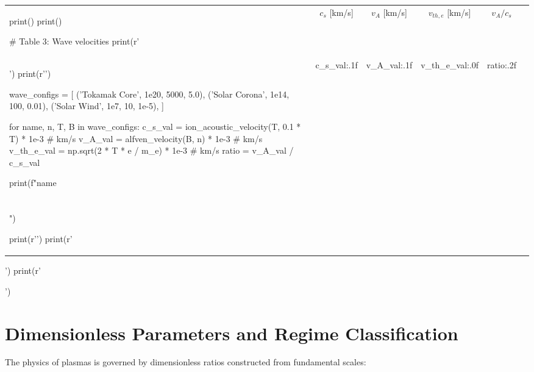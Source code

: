\documentclass[11pt,a4paper]{article}
\begin{document}
\begin{pycode}
\begin{table}[H]
\begin{tabular}{@{}lccccc@{}}
print()
print()

# Table 3: Wave velocities
print(r'\begin{table}[H]')
print(r'\centering')
print(r'\caption{Wave Propagation Velocities}')
print(r'\begin{tabular}{@{}lcccc@{}}')
print(r'\toprule')
print(r'Regime & $c_s$ [km/s] & $v_A$ [km/s] & $v_{th,e}$ [km/s] & $v_A/c_s$ \\')
print(r'\midrule')

wave_configs = [
    ('Tokamak Core', 1e20, 5000, 5.0),
    ('Solar Corona', 1e14, 100, 0.01),
    ('Solar Wind', 1e7, 10, 1e-5),
]

for name, n, T, B in wave_configs:
    c_s_val = ion_acoustic_velocity(T, 0.1 * T) * 1e-3  # km/s
    v_A_val = alfven_velocity(B, n) * 1e-3  # km/s
    v_th_e_val = np.sqrt(2 * T * e / m_e) * 1e-3  # km/s
    ratio = v_A_val / c_s_val

    print(f"{name} & {c_s_val:.1f} & {v_A_val:.1f} & {v_th_e_val:.0f} & {ratio:.2f} \\\\")

print(r'\bottomrule')
print(r'\end{tabular}')
print(r'\end{table}')

\end{pycode}

\section{Dimensionless Parameters and Regime Classification}

The physics of plasmas is governed by dimensionless ratios constructed from fundamental scales:
\end{document}
